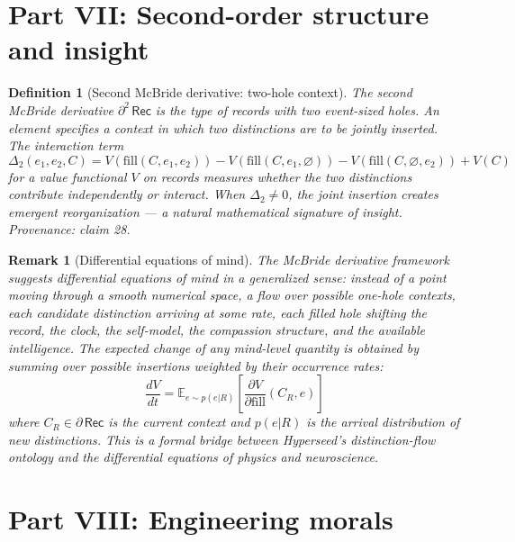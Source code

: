 \documentclass[11pt]{article}
\newtheorem{definition}{Definition}
\newtheorem{remark}{Remark}
\begin{document}
\section{Part VII: Second-order structure and insight}

\begin{definition}[Second McBride derivative: two-hole context]
\label{def:mcbride2}
The second McBride derivative $\partial^2\,\mathsf{Rec}$ is the type of records with \emph{two} event-sized holes. An element specifies a context in which two distinctions are to be jointly inserted. The \emph{interaction term}
\[
  \Delta_2(e_1, e_2, C) = V(\mathrm{fill}(C, e_1, e_2)) - V(\mathrm{fill}(C, e_1, \varnothing)) - V(\mathrm{fill}(C, \varnothing, e_2)) + V(C)
\]
for a value functional $V$ on records measures whether the two distinctions contribute independently or interact. When $\Delta_2 \neq 0$, the joint insertion creates emergent reorganization --- a natural mathematical signature of \emph{insight}.
\emph{Provenance: claim 28.}
\end{definition}

\begin{remark}[Differential equations of mind]
The McBride derivative framework suggests differential equations of mind in a generalized sense: instead of a point moving through a smooth numerical space, a flow over possible one-hole contexts, each candidate distinction arriving at some rate, each filled hole shifting the record, the clock, the self-model, the compassion structure, and the available intelligence. The expected change of any mind-level quantity is obtained by summing over possible insertions weighted by their occurrence rates:
\[
  \frac{dV}{dt} = \mathbb{E}_{e \sim p(e|R)}\!\left[\frac{\partial V}{\partial \mathrm{fill}}(C_R, e)\right]
\]
where $C_R \in \partial\,\mathsf{Rec}$ is the current context and $p(e|R)$ is the arrival distribution of new distinctions. This is a formal bridge between Hyperseed's distinction-flow ontology and the differential equations of physics and neuroscience.
\end{remark}

\section{Part VIII: Engineering morals}
\end{document}
